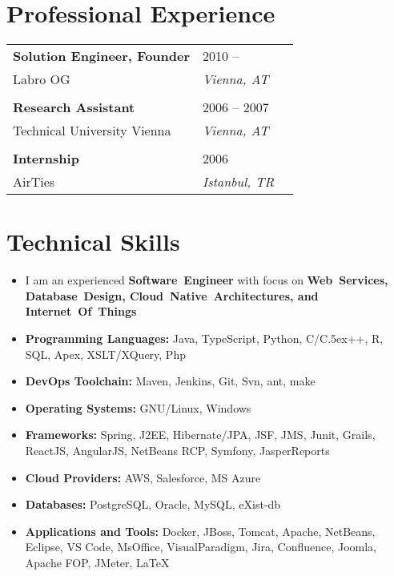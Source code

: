 \documentclass[letterpaper,11pt]{article}
\def\Cplusplus{{\rm C\raise.5ex\hbox{\tiny ++}}}
\begin{document}

\section{\bf Professional Experience}
\vspace{-1em}
\begin{longtable}{  L{0.70\textwidth}  R{0.25\textwidth}  R{0.05\textwidth }} 
\textbf{Solution Engineer, Founder} & 2010 -- \\
Labro OG & \textit{Vienna, AT} \\
\vspace{1pt}\\
\textbf{Research Assistant} & 2006 -- 2007\\
Technical University Vienna & \textit{Vienna, AT} \\
\vspace{1pt}\\
\textbf{Internship} & 2006\\
AirTies & \textit{Istanbul, TR} \\
\end{longtable}

\section{\bf Technical Skills}
\begin{itemize}
       \setlength{\leftmargini}{0.5cm}    %
        \setlength{\itemsep}{0.2em}       %
        \setlength{\topsep}{5pt}         %
        \setlength{\partopsep}{10pt}      %
\item {\Large I am an experienced \textbf{Software~Engineer} with focus on \textbf{Web~Services, Database~Design, Cloud~Native~Architectures, and Internet~Of~Things}}
\item \textbf{Programming Languages:} Java, TypeScript, Python, C/\Cplusplus, R, SQL, Apex, XSLT/XQuery, Php
\item \textbf{DevOps Toolchain:} Maven, Jenkins, Git, Svn, ant, make
\item \textbf{Operating Systems:} GNU/Linux, Windows
\item \textbf{Frameworks:} Spring, J2EE, Hibernate/JPA, JSF, JMS, Junit, Grails, ReactJS, AngularJS, NetBeans RCP, Symfony, JasperReports
\item \textbf{Cloud Providers:} AWS, Salesforce, MS Azure
\item \textbf{Databases:} PostgreSQL, Oracle, MySQL, eXist-db 
\item \textbf{Applications and Tools:} Docker, JBoss, Tomcat, Apache, NetBeans, Eclipse, VS Code, MsOffice, VisualParadigm, Jira, Confluence, Joomla, Apache FOP, JMeter, \LaTeX
\end{itemize}
\end{document}
